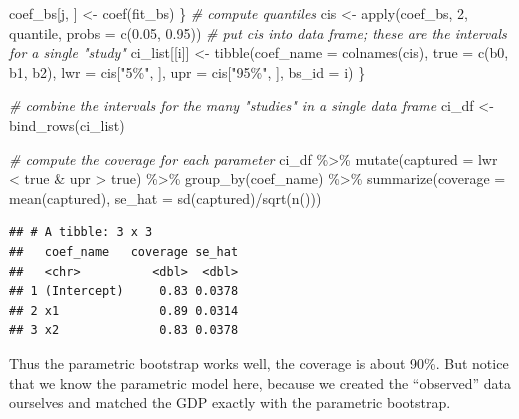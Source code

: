 \documentclass[
]{book}
\newenvironment{Shaded}{\begin{snugshade}}{\end{snugshade}}
\newcommand{\AttributeTok}[1]{\textcolor[rgb]{0.77,0.63,0.00}{#1}}
\newcommand{\CommentTok}[1]{\textcolor[rgb]{0.56,0.35,0.01}{\textit{#1}}}
\newcommand{\DecValTok}[1]{\textcolor[rgb]{0.00,0.00,0.81}{#1}}
\newcommand{\FloatTok}[1]{\textcolor[rgb]{0.00,0.00,0.81}{#1}}
\newcommand{\FunctionTok}[1]{\textcolor[rgb]{0.00,0.00,0.00}{#1}}
\newcommand{\NormalTok}[1]{#1}
\newcommand{\OtherTok}[1]{\textcolor[rgb]{0.56,0.35,0.01}{#1}}
\newcommand{\SpecialCharTok}[1]{\textcolor[rgb]{0.00,0.00,0.00}{#1}}
\newcommand{\StringTok}[1]{\textcolor[rgb]{0.31,0.60,0.02}{#1}}
\begin{document}
\begin{Shaded}
\begin{Highlighting}[]
\NormalTok{    coef\_bs[j, ] }\OtherTok{\textless{}{-}} \FunctionTok{coef}\NormalTok{(fit\_bs)}
\NormalTok{  \}}
  \CommentTok{\# compute quantiles}
\NormalTok{  cis }\OtherTok{\textless{}{-}} \FunctionTok{apply}\NormalTok{(coef\_bs, }\DecValTok{2}\NormalTok{, quantile, }\AttributeTok{probs =} \FunctionTok{c}\NormalTok{(}\FloatTok{0.05}\NormalTok{, }\FloatTok{0.95}\NormalTok{))}
  \CommentTok{\# put cis into data frame; these are the intervals for a single "study"}
\NormalTok{  ci\_list[[i]] }\OtherTok{\textless{}{-}} \FunctionTok{tibble}\NormalTok{(}\AttributeTok{coef\_name =} \FunctionTok{colnames}\NormalTok{(cis),}
                         \AttributeTok{true =} \FunctionTok{c}\NormalTok{(b0, b1, b2),}
                  \AttributeTok{lwr =}\NormalTok{ cis[}\StringTok{"5\%"}\NormalTok{, ],}
                  \AttributeTok{upr =}\NormalTok{ cis[}\StringTok{"95\%"}\NormalTok{, ], }
                  \AttributeTok{bs\_id =}\NormalTok{ i)}
\NormalTok{\}}

\CommentTok{\# combine the intervals for the many "studies" in a single data frame}
\NormalTok{ci\_df }\OtherTok{\textless{}{-}} \FunctionTok{bind\_rows}\NormalTok{(ci\_list)}

\CommentTok{\# compute the coverage for each parameter}
\NormalTok{ci\_df }\SpecialCharTok{\%\textgreater{}\%}
  \FunctionTok{mutate}\NormalTok{(}\AttributeTok{captured =}\NormalTok{ lwr }\SpecialCharTok{\textless{}}\NormalTok{ true }\SpecialCharTok{\&}\NormalTok{ upr }\SpecialCharTok{\textgreater{}}\NormalTok{ true) }\SpecialCharTok{\%\textgreater{}\%}
  \FunctionTok{group\_by}\NormalTok{(coef\_name) }\SpecialCharTok{\%\textgreater{}\%}
  \FunctionTok{summarize}\NormalTok{(}\AttributeTok{coverage =} \FunctionTok{mean}\NormalTok{(captured), }
            \AttributeTok{se\_hat =} \FunctionTok{sd}\NormalTok{(captured)}\SpecialCharTok{/}\FunctionTok{sqrt}\NormalTok{(}\FunctionTok{n}\NormalTok{()))}
\end{Highlighting}
\end{Shaded}

\begin{verbatim}
## # A tibble: 3 x 3
##   coef_name   coverage se_hat
##   <chr>          <dbl>  <dbl>
## 1 (Intercept)     0.83 0.0378
## 2 x1              0.89 0.0314
## 3 x2              0.83 0.0378
\end{verbatim}

Thus the parametric bootstrap works well, the coverage is about 90\%. But notice that we know the parametric model here, because we created the ``observed'' data ourselves and matched the GDP exactly with the parametric bootstrap.
\end{document}
